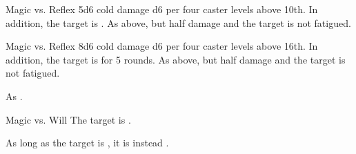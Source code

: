 \begin{spellheader}
    \spelldur{\durshort}
\end{spellheader}
\begin{spelleffects}
    \begin{spellattack}{Magic vs. Reflex}
        \spellsuccess 5d6 cold damage \add d6 per four caster levels above 10th. In addition, the target is \fatigued.
        \spellfailure As above, but half damage and the target is not fatigued.
    \end{spellattack}
\end{spelleffects}
\begin{spellfooter}
    \spellnotes \destructivespellnotes
\end{spellfooter}

\begin{spellheader}
\end{spellheader}
\begin{spelleffects}
    \begin{spellattack}{Magic vs. Reflex}
        \spellsuccess 8d6 cold damage \add d6 per four caster levels above 16th. In addition, the target is \fatigued for 5 rounds.
        \spellfailure As above, but half damage and the target is not fatigued.
    \end{spellattack}
\end{spelleffects}
\begin{spellfooter}
    \spellnotes As .
\end{spellfooter}

\begin{spellheader}
    \spellrng{\rngmed}
    \spelldur{\durshort}
\end{spellheader}
\begin{spelleffects}
    \begin{spellattack}{Magic vs. Will}
        \spellsuccess The target is \bewildered.

        As long as the target is \bloodied, it is instead \confused.
    \end{spellattack}
\end{spelleffects}
\begin{spellfooter}

\end{spellfooter}

